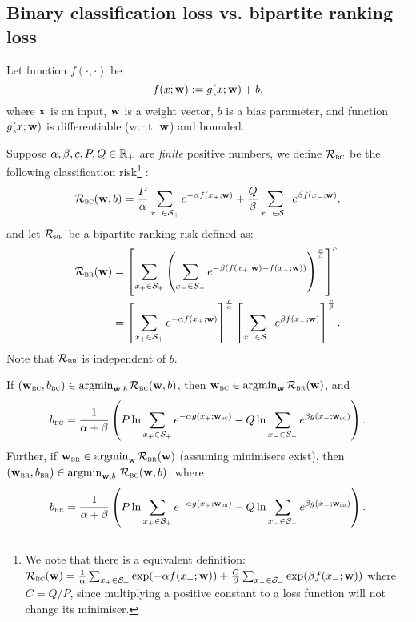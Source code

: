 \subsection{Binary classification loss vs. bipartite ranking loss}

Let function $f(\cdot, \cdot)$ be
$$
f(x; \mathbf{w}) := g(x; \mathbf{w}) + b,
$$
where $\mathbf{x}$ is an input, $\mathbf{w}$ is a weight vector, $b$ is a bias parameter, 
and function $g(x; \mathbf{w})$ is differentiable (w.r.t. $\mathbf{w}$) and bounded.

Suppose $\alpha, \beta, c, P, Q \in \mathbb{R}_+$ are \emph{finite} positive numbers, we define 
$\mathcal{R}_\textsc{bc}$ be the following classification risk\footnote{
We note that there is a equivalent definition:
$\mathcal{R}_\textsc{bc}(\mathbf{w}) = \frac{1}{\alpha} \sum_{x_+ \in \mathcal{S}_+} \exp(-\alpha f(x_+; \mathbf{w})) + 
\frac{C}{\beta} \sum_{x_- \in \mathcal{S}_-} \exp( \beta f(x_-; \mathbf{w}))$
where $C = Q/P$, since multiplying a positive constant to a loss function will not change its minimiser.}
:
\begin{equation*}
\mathcal{R}_\textsc{bc}(\mathbf{w}, b)
= \displaystyle 
  \frac{P}{\alpha} \sum_{x_+ \in \mathcal{S}_+} e^{-\alpha f(x_+; \mathbf{w})} +
  \frac{Q}{\beta}  \sum_{x_- \in \mathcal{S}_-} e^{ \beta  f(x_-; \mathbf{w})},
\end{equation*}
and let
$\mathcal{R}_\textsc{br}$ be a bipartite ranking risk defined as:
\begin{equation*}
\begin{aligned}
\mathcal{R}_\textsc{br}(\mathbf{w})
&= \left[ \displaystyle 
   \sum_{x_+ \in \mathcal{S}_+} \left( \sum_{x_- \in \mathcal{S}_-} e^{-\beta (f(x_+; \mathbf{w}) - f(x_-; \mathbf{w}))} \right)^\frac{\alpha}{\beta} 
   \right]^c \\
&= \left[ \sum_{x_+ \in \mathcal{S}_+} e^{-\alpha f(x_+; \mathbf{w})} \right]^\frac{c}{\alpha}
   \left[ \sum_{x_- \in \mathcal{S}_-} e^{ \beta  f(x_-; \mathbf{w})} \right]^\frac{c}{\beta}.
\end{aligned}
\end{equation*}
Note that $\mathcal{R}_\textsc{br}$ is independent of $b$.


\begin{theorem}
\label{th:bc=br}
If $(\mathbf{w}_\textsc{bc}, b_\textsc{bc}) \in \operatorname*{argmin}_{\mathbf{w},b} \mathcal{R}_\textsc{bc}(\mathbf{w}, b)$,
then $\mathbf{w}_\textsc{bc} \in \operatorname*{argmin}_{\mathbf{w}} \mathcal{R}_\textsc{br}(\mathbf{w})$, and
$$
\displaystyle
b_\textsc{bc} 
= \frac{1}{\alpha + \beta} \left( 
  P \ln \sum_{x_+ \in \mathcal{S}_+} e^{-\alpha g(x_+; \mathbf{w}_\textsc{bc})} -
  Q \ln \sum_{x_- \in \mathcal{S}_-} e^{  \beta g(x_-; \mathbf{w}_\textsc{bc})} \right).
$$
Further, if $\mathbf{w}_\textsc{br} \in \operatorname*{argmin}_{\mathbf{w}} \mathcal{R}_\textsc{br}(\mathbf{w})$ (assuming minimisers exist),
then $(\mathbf{w}_\textsc{br}, b_\textsc{br}) \in \operatorname*{argmin}_{\mathbf{w},b} \, \mathcal{R}_\textsc{bc}(\mathbf{w}, b)$, where
$$
\displaystyle
b_\textsc{br} 
= \frac{1}{\alpha + \beta} \left( 
  P \ln \sum_{x_+ \in \mathcal{S}_+} e^{-\alpha g(x_+; \mathbf{w}_\textsc{br})} -
  Q \ln \sum_{x_- \in \mathcal{S}_-} e^{  \beta g(x_-; \mathbf{w}_\textsc{br})} \right).
$$
\end{theorem}

